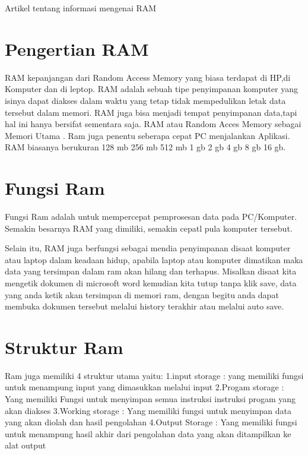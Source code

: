 




Artikel tentang informasi mengenai RAM

\section{Pengertian RAM}
RAM kepanjangan dari Random Access Memory yang biasa terdapat di HP,di Komputer dan di leptop.
RAM adalah sebuah tipe penyimpanan komputer yang isinya dapat diakses dalam waktu yang tetap tidak mempedulikan letak data tersebut dalam memori.
RAM juga bisa menjadi tempat penyimpanan data,tapi hal ini hanya bersifat sementara saja.
RAM atau Random Acces Memory sebagai Memori Utama . Ram juga penentu seberapa cepat PC menjalankan Aplikasi.
RAM biasanya berukuran 128 mb 256 mb 512 mb 1 gb 2 gb 4 gb 8 gb 16 gb.

\section{Fungsi Ram}

Fungsi Ram adalah untuk mempercepat pemprosesan data pada PC/Komputer. 
Semakin besarnya RAM yang dimiliki, 
semakin cepatl pula komputer tersebut.

Selain itu, RAM juga berfungsi sebagai mendia penyimpanan disaat komputer atau laptop dalam keadaan hidup, 
apabila laptop atau komputer dimatikan maka data yang tersimpan dalam ram akan hilang dan terhapus. 
Misalkan disaat kita mengetik dokumen di microsoft word kemudian kita tutup tanpa klik save, 
data yang anda ketik akan tersimpan di memori ram, dengan begitu anda dapat membuka dokumen tersebut melalui history terakhir atau melalui auto save.

\section{Struktur Ram}

Ram juga memiliki 4 struktur utama yaitu:
1.input storage : yang memiliki fungsi untuk menampung input yang dimasukkan melalui input
2.Progam storage : Yang memiliki Fungsi untuk menyimpan semua instruksi instruksi progam yang akan diakses
3.Working storage : Yang memiliki fungsi untuk menyimpan data yang akan diolah dan hasil pengolahan
4.Output Storage : Yang memiliki fungsi untuk menampung hasil akhir dari pengolahan data yang akan ditampilkan ke alat output

